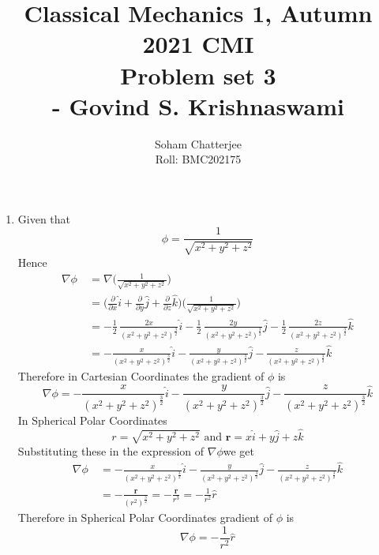 \documentclass{article}
\title{\huge{Classical Mechanics 1, Autumn 2021 CMI \\ Problem set 3\\\hspace{7cm}- Govind S. Krishnaswami}
}
\author{Soham Chatterjee\\Roll: BMC202175}
\date{}
\begin{document}
	\maketitle
	\pagebreak

\begin{enumerate}
	\item Given that $$\phi=\frac{1}{\sqrt{x^2+y^2+z^2}}$$Hence\begin{align*}
		\nabla \phi\ &=\nabla\bigg(\frac{1}{\sqrt{x^2+y^2+z^2}}\bigg)\\
		&=\bigg(\frac{\partial}{\partial x}\hat{i}+\frac{\partial}{\partial y}\hat{j}+\frac{\partial}{\partial z}\hat{k}\bigg)\bigg(\frac{1}{\sqrt{x^2+y^2+z^2}}\bigg)\\
		&=-\frac{1}{2}\, \frac{2x}{(x^2+y^2+z^2)^{\frac{3}{2}}}\hat{i}-\frac{1}{2}\, \frac{2y}{(x^2+y^2+z^2)^{\frac{3}{2}}}\hat{j}-\frac{1}{2}\, \frac{2z}{(x^2+y^2+z^2)^{\frac{3}{2}}}\hat{k}\\
		&=-\frac{x}{(x^2+y^2+z^2)^{\frac{3}{2}}}\hat{i}-\frac{y}{(x^2+y^2+z^2)^{\frac{3}{2}}}\hat{j}-\frac{z}{(x^2+y^2+z^2)^{\frac{3}{2}}}\hat{k}
	\end{align*}Therefore in Cartesian  Coordinates the gradient of $\phi$ is $$\nabla\phi=-\frac{x}{(x^2+y^2+z^2)^{\frac{3}{2}}}\hat{i}-\frac{y}{(x^2+y^2+z^2)^{\frac{3}{2}}}\hat{j}-\frac{z}{(x^2+y^2+z^2)^{\frac{3}{2}}}\hat{k}$$In Spherical Polar Coordinates $$r=\sqrt{x^2+y^2+z^2}\text{ and }\boldsymbol{r}=x\hat{i}+y\hat{j}+z\hat{k}$$Substituting these in the expression of $\nabla\phi$we get\begin{align*}
	\nabla \phi\ &=-\frac{x}{(x^2+y^2+z^2)^{\frac{3}{2}}}\hat{i}-\frac{y}{(x^2+y^2+z^2)^{\frac{3}{2}}}\hat{j}-\frac{z}{(x^2+y^2+z^2)^{\frac{3}{2}}}\hat{k}\\
	&=-\frac{\boldsymbol{r}}{(r^2)^{\frac{3}{2}}}=-\frac{\boldsymbol{r}}{r^{3}}=-\frac{1}{r^2}\hat{r}
	\end{align*}Therefore in Spherical Polar Coordinates gradient of $\phi$ is $$\nabla\phi=-\frac{1}{r^2}\hat{r}$$


\end{enumerate}
\end{document}
